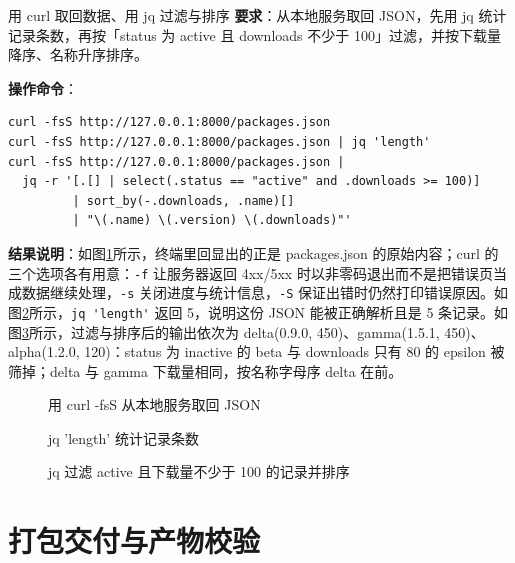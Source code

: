 \begin{exercise}{用 curl 取回数据、用 jq 过滤与排序}
\textbf{要求}：从本地服务取回 JSON，先用 jq 统计记录条数，再按「status 为 active 且 downloads 不少于 100」过滤，并按下载量降序、名称升序排序。

\textbf{操作命令}：
\begin{lstlisting}
curl -fsS http://127.0.0.1:8000/packages.json
curl -fsS http://127.0.0.1:8000/packages.json | jq 'length'
curl -fsS http://127.0.0.1:8000/packages.json |
  jq -r '[.[] | select(.status == "active" and .downloads >= 100)]
         | sort_by(-.downloads, .name)[]
         | "\(.name) \(.version) \(.downloads)"'
\end{lstlisting}

\textbf{结果说明}：如图\ref{fig:ms4-09a}所示，终端里回显出的正是 packages.json 的原始内容；curl 的三个选项各有用意：\verb|-f| 让服务器返回 4xx/5xx 时以非零码退出而不是把错误页当成数据继续处理，\verb|-s| 关闭进度与统计信息，\verb|-S| 保证出错时仍然打印错误原因。如图\ref{fig:ms4-09b}所示，\verb|jq 'length'| 返回 5，说明这份 JSON 能被正确解析且是 5 条记录。如图\ref{fig:ms4-09c}所示，过滤与排序后的输出依次为 delta(0.9.0, 450)、gamma(1.5.1, 450)、alpha(1.2.0, 120)：status 为 inactive 的 beta 与 downloads 只有 80 的 epsilon 被筛掉；delta 与 gamma 下载量相同，按名称字母序 delta 在前。

\begin{figure}[H]
    \centering
    \caption{用 curl -fsS 从本地服务取回 JSON}
    \label{fig:ms4-09a}
\end{figure}

\begin{figure}[H]
    \centering
    \caption{jq 'length' 统计记录条数}
    \label{fig:ms4-09b}
\end{figure}

\begin{figure}[H]
    \centering
    \caption{jq 过滤 active 且下载量不少于 100 的记录并排序}
    \label{fig:ms4-09c}
\end{figure}
\end{exercise}

\section{打包交付与产物校验}

